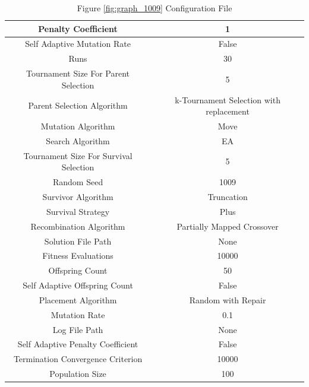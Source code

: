 \documentclass{standalone}
\begin{document}
\begin{table}[!htb]
	\centering
	\caption{Figure \ref{fig:graph_1009} Configuration File}
	\label{tab:graph_1009}
	\begin{tabular}{| c | c |}
		\hline
		Penalty Coefficient		& 1		 \\
		\hline
		Self Adaptive Mutation Rate		& False		 \\
		\hline
		Runs		& 30		 \\
		\hline
		Tournament Size For Parent Selection		& 5		 \\
		\hline
		Parent Selection Algorithm		& k-Tournament Selection with replacement		 \\
		\hline
		Mutation Algorithm		& Move		 \\
		\hline
		Search Algorithm		& EA		 \\
		\hline
		Tournament Size For Survival Selection		& 5		 \\
		\hline
		Random Seed		& 1009		 \\
		\hline
		Survivor Algorithm		& Truncation		 \\
		\hline
		Survival Strategy		& Plus		 \\
		\hline
		Recombination Algorithm		& Partially Mapped Crossover		 \\
		\hline
		Solution File Path		& None		 \\
		\hline
		Fitness Evaluations		& 10000		 \\
		\hline
		Offspring Count		& 50		 \\
		\hline
		Self Adaptive Offspring Count		& False		 \\
		\hline
		Placement Algorithm		& Random with Repair		 \\
		\hline
		Mutation Rate		& 0.1		 \\
		\hline
		Log File Path		& None		 \\
		\hline
		Self Adaptive Penalty Coefficient		& False		 \\
		\hline
		Termination Convergence Criterion		& 10000		 \\
		\hline
		Population Size		& 100		 \\
		\hline
	\end{tabular}
\end{table}
\end{document}
